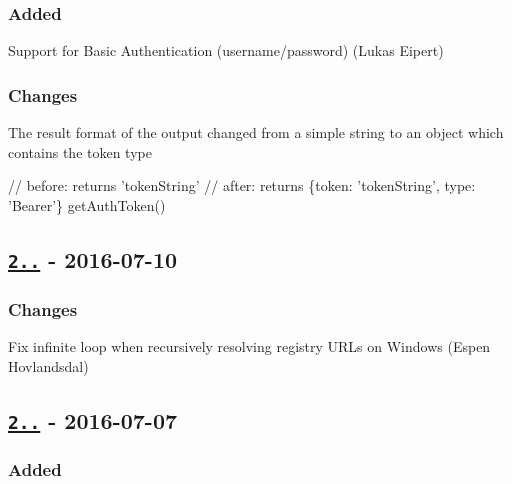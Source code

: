 \subsubsection*{Added}


\begin{DoxyItemize}
\item Support for Basic Authentication (username/password) (Lukas Eipert)
\end{DoxyItemize}

\subsubsection*{Changes}


\begin{DoxyItemize}
\item The result format of the output changed from a simple string to an object which contains the token type
\end{DoxyItemize}


\begin{DoxyCode}
// before: returns 'tokenString'
// after: returns \{token: 'tokenString', type: 'Bearer'\}
getAuthToken()
\end{DoxyCode}


\subsection*{\href{https://github.com/rexxars/registry-auth-token/compare/v2.1.0...v2.1.1}{\tt 2..} -\/ 2016-\/07-\/10}

\subsubsection*{Changes}


\begin{DoxyItemize}
\item Fix infinite loop when recursively resolving registry U\+R\+Ls on Windows (Espen Hovlandsdal)
\end{DoxyItemize}

\subsection*{\href{https://github.com/rexxars/registry-auth-token/compare/v2.0.0...v2.1.0}{\tt 2..} -\/ 2016-\/07-\/07}

\subsubsection*{Added}


